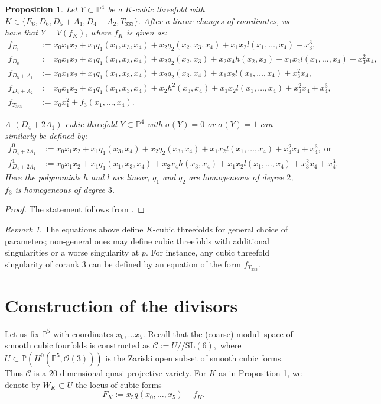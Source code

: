 \documentclass[12pt]{amsart}
\numberwithin{equation}{section}
\theoremstyle{plain}
\newtheorem{proposition}[equation]{Proposition}
\theoremstyle{remark}
\newtheorem{remark}[equation]{Remark}
\theoremstyle{definition}
\newcommand{\bP}{\mathbb{P}}
\newcommand{\calC}{\mathcal{C}}
\newcommand{\calO}{\mathcal{O}}
\newcommand{\SL}{\mathrm{SL}}
\begin{document}
\begin{proposition} \label{prop: equations}
    Let $Y\subset \bP^4$ be a $K$-cubic threefold with $K\in \{E_6, D_6, D_5+A_1, D_4+A_2, T_{333}\}.$ After a linear changes of coordinates, we have that $Y=V(f_K)$, where $f_K$ is given as:
    \begin{align*}
        f_{E_6}&:=x_0x_1x_2+x_1q_1(x_1,x_3,x_4)+x_2q_2(x_2,x_3,x_4)+x_1x_2l(x_1,\ldots,x_4)+x_3^3,\\
        f_{D_6}&:=x_0x_1x_2+x_1q_1(x_1,x_3,x_4)+x_2q_2(x_2,x_3)+x_2x_4h(x_2,x_3)+x_1x_2l(x_1,\ldots,x_4)+x_3^2x_4,\\
        f_{D_5+A_1}&:=x_0x_1x_2+x_1q_1(x_1,x_3,x_4)+x_2q_2(x_3,x_4)+x_1x_2l(x_1,\ldots,x_4)+x_3^2x_4,\\
        f_{D_4+A_2}&:=x_0x_1x_2+x_1q_1(x_1,x_3,x_4)+x_2h^2(x_3,x_4)+x_1x_2l(x_1,\ldots,x_4)+x_3^2x_4+x_4^3,\\
        f_{T_{333}}&:=x_0x_1^2+f_3(x_1,\ldots,x_4).
    \end{align*}

    A $(D_4+2A_1)$-cubic threefold $Y\subset\bP^4$ with $\sigma(Y)=0$ or $\sigma(Y)=1$ can similarly be defined by:
    \begin{align*}
    f_{D_4+2A_1}^0&:=x_0x_1x_2+x_1q_1(x_3,x_4)+x_2q_2(x_3,x_4)+x_1x_2l(x_1,\ldots,x_4)+x_3^2x_4+x_4^3,\;\text{or}\\        f_{D_4+2A_1}^1&:=x_0x_1x_2+x_1q_1(x_1,x_3,x_4)+x_2x_4h(x_3,x_4)+x_1x_2l(x_1,\ldots,x_4)+x_3^2x_4+x_4^3.
    \end{align*}
    Here the polynomials $h$ and $l$ are linear, $q_1$ and $q_2$ are homogeneous of degree $2$, $f_3$ is homogeneous of degree $3$.
\end{proposition}
\begin{proof}
    The statement follows from \cite[Propositions 2.2, 3.11, 3.14]{viktorova2023classification}.
\end{proof}
\begin{remark}\label{non-general}
    The equations above define $K$-cubic threefolds for general choice of parameters; non-general ones may define cubic threefolds with additional singularities or a worse singularity at $p$. For instance, any cubic threefold singularity of corank $3$ can be defined by an equation of the form $f_{T_{333}}$.
\end{remark}

\section{Construction of the divisors}\label{sec: construction}
Let us fix $\bP^5$ with coordinates $x_0,\dots x_5.$ Recall that the (coarse) moduli space of smooth cubic fourfolds is constructed as $\calC:=U//\SL(6),$ where $U\subset \bP(H^0(\bP^5,\calO(3)))$ is the Zariski open subset of smooth cubic forms. Thus $\calC$ is a 20 dimensional quasi-projective variety. For $K$ as in Proposition \ref{prop: equations}, we denote by $W_K\subset U$ the locus of cubic forms
\begin{equation}\label{eqn: fourfold}
        F_K:=x_5q(x_0,\ldots,x_5)+f_K.
    \end{equation}
\end{document}
